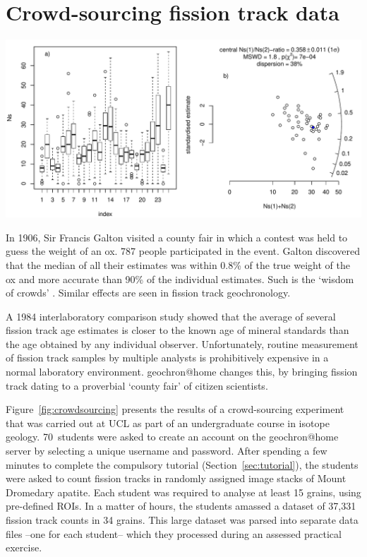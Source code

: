 \documentclass[gchron, manuscript]{copernicus}
\begin{document}
\section{Crowd-sourcing fission track data}\label{sec:crowdsourcing}

{ \centering \includegraphics[width=15cm]{radialcrowd.pdf}
  \label{fig:radialcrowd}
}%

In 1906, Sir Francis Galton visited a county fair in which a contest
was held to guess the weight of an ox. 787 people participated in the
event. Galton discovered that the median of all their estimates was
within 0.8\% of the true weight of the ox and more accurate than 90\%
of the individual estimates. Such is the `wisdom of crowds'
\citep{galton1907a}. Similar effects are seen in fission track
geochronology.\medskip

A 1984 interlaboratory comparison study \citep{miller1985} showed that
the average of several fission track age estimates is closer to the
known age of mineral standards than the age obtained by any individual
observer. Unfortunately, routine measurement of fission track samples
by multiple analysts is prohibitively expensive in a normal laboratory
environment. geochron@home changes this, by bringing fission
track dating to a proverbial `county fair' of citizen
scientists.\medskip

Figure~\ref{fig:crowdsourcing} presents the results of a
crowd-sourcing experiment that was carried out at UCL as part of an
undergraduate course in isotope geology. 70~students were asked to
create an account on the geochron@home server by selecting a
unique username and password. After spending a few minutes to complete
the compulsory tutorial (Section~\ref{sec:tutorial}), the students
were asked to count fission tracks in randomly assigned image stacks
of Mount Dromedary apatite. Each student was required to analyse at
least 15 grains, using pre-defined ROIs. In a matter of hours, the
students amassed a dataset of 37,331 fission track counts in 34
grains. This large dataset was parsed into separate data files --one
for each student-- which they processed during an assessed practical
exercise.\medskip
\end{document}
